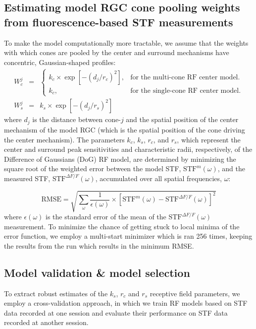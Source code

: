 \documentclass[11pt, oneside]{article}   	%
\begin{document}
\subsection{Estimating model RGC cone pooling weights from fluorescence-based STF measurements}
%
To make the model computationally more tractable, we assume that the weights with which cones are pooled by the center and surround mechanisms have concentric, Gaussian-shaped profiles:
\begin{eqnarray}
W_c^j  & = & \begin{cases}
   k_c \times  \exp \left [ -\left( d_{j}/r_c \right) ^2 \right ], & \text{for the multi-cone RF center model}.\\
   k_c, & \text{for the single-cone RF center model}.
   \end{cases} \\
W_s^j &= &k_s \times \exp \left [ -\left( d_{j}/r_s \right) ^2 \right ]
\end{eqnarray}
\noindent where $d_j$ is the distance between cone-$j$ and the spatial position of the center mechanism of the model RGC (which is the spatial position of the cone driving the center mechanism). The parameters $k_c$, $k_s$, $r_c$, and $r_s$, which represent the center and surround peak sensitivities and characteristic radii, respectively, of the Difference of Gaussians (DoG) RF model, are determined by minimizing the square root of the weighted error between the model STF, $\mbox{STF}^{m}(\omega)$, and the measured STF, $\mbox{STF}^{\Delta F / F}(\omega)$, accumulated over all spatial frequencies, $\omega$:

\begin{equation}
\mbox{RMSE} = \displaystyle \sqrt{\sum_{\omega} \frac{1}{\epsilon({\omega})} \times {\left [  \mbox{STF}^{m}(\omega)  - \mbox{STF}^{\Delta F / F}(\omega) \right ] }^2}
\end{equation}
where $\epsilon({\omega})$ is the standard error of the mean of the $\mbox{STF}^{\Delta F / F}(\omega)$ measurement. To minimize the chance of getting stuck to local minima of the error function, we employ a multi-start minimizer which is ran 256 times, keeping the results from the run which results in the minimum RMSE.


\subsection{Model validation \& model selection}
To extract robust estimates of the $k_s$, $r_c$ and $r_s$ receptive field  parameters, we employ a cross-validation approach, in which we train RF models based on STF data recorded at one session and evaluate their performance on STF data recorded at another session.
\end{document}
